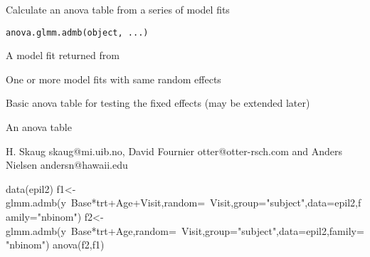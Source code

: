 \begin{Description}\relax
Calculate an anova table from a series of model fits
\end{Description}
\begin{Usage}
\begin{verbatim}
anova.glmm.admb(object, ...)
\end{verbatim}
\end{Usage}
\begin{Arguments}
\begin{ldescription}
\item[\code{object}] A model fit returned from 
\item[\code{...}] One or more model fits with same random effects
\end{ldescription}
\end{Arguments}
\begin{Details}\relax
Basic anova table for testing the fixed effects (may be extended later)
\end{Details}
\begin{Value}
An anova table
\end{Value}
\begin{Author}\relax
H. Skaug skaug@mi.uib.no, David Fournier otter@otter-rsch.com and Anders Nielsen andersn@hawaii.edu
\end{Author}
\begin{Examples}
\begin{ExampleCode}
  data(epil2)
  f1<-glmm.admb(y~Base*trt+Age+Visit,random=~Visit,group="subject",data=epil2,family="nbinom")
  f2<-glmm.admb(y~Base*trt+Age,random=~Visit,group="subject",data=epil2,family="nbinom")
  anova(f2,f1)
\end{ExampleCode}
\end{Examples}

